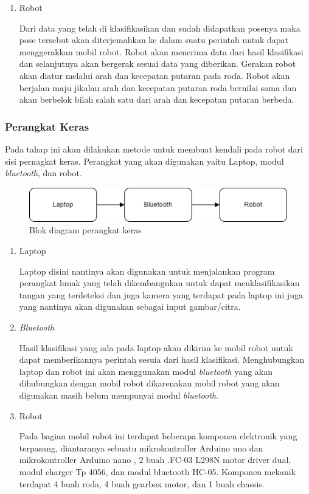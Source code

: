 \begin{enumerate}
  \item Robot \par
  Dari data yang telah di klasifikasikan dan sudah didapatkan posenya maka pose tersebut akan diterjemahkan ke dalam suatu perintah untuk dapat menggerakkan mobil robot. Robot akan menerima data dari hasil klasifikasi dan selanjutnya akan bergerak sesuai data yang diberikan. Gerakan robot akan diatur melalui arah dan kecepatan putaran pada roda. Robot akan berjalan maju jikalau arah dan kecepatan putaran roda bernilai sama dan akan berbelok bilah salah satu dari arah dan kecepatan putaran berbeda.
\end{enumerate}

\subsubsection{Perangkat Keras}
Pada tahap ini akan dilakukan metode untuk membuat kendali pada robot dari sisi pernagkat keras. Perangkat yang akan digunakan yaitu Laptop, modul \textit{bluetooth}, dan robot. 
\begin{figure}[!h]
	\centering
	\includegraphics[width=0.7\linewidth]{"gambar/gambar perangkat keras"}
	\caption{Blok diagram perangkat keras}
	\label{fig:gambar33}
\end{figure}

\begin{enumerate}
  \item Laptop \par
  Laptop disini nantinya akan digunakan untuk menjalankan program perangkat lunak yang telah dikembangnkan untuk dapat menklasifikasikan tangan yang terdeteksi dan juga kamera yang terdapat pada laptop ini juga yang nantinya akan digunakan sebagai input gambar/citra.

  \item \textit{Bluetooth} \par
  Hasil klasifikasi yang ada pada laptop akan dikirim ke mobil robot untuk dapat memberikannya perintah sesuia dari hasil klasifikasi. Menghubungkan laptop dan robot ini akan menggunakan modul \textit{bluetooth} yang akan dihubungkan dengan mobil robot dikarenakan mobil robot yang akan digunakan masih belum mempunyai modul \textit{bluetooth}. 

  \item Robot \par
  Pada bagian mobil robot ini terdapat beberapa komponen elektronik yang terpasang, diantaranya sebuatu mikrokontroller Arduino uno dan mikrokontroller Arduino nano , 2 buah .FC-03 L298N motor driver dual, modul charger Tp 4056, dan modul bluetooth HC-05. Komponen mekanik terdapat 4 buah roda, 4 buah gearbox motor, dan 1 buah chassis.
\end{enumerate}

